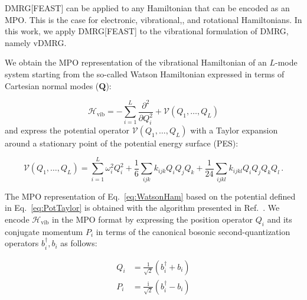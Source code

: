 \documentclass[journal=jctcce]{achemso}
\begin{document}
DMRG[FEAST] can be applied to any Hamiltonian that can be encoded as an MPO.
This is the case for electronic,\cite{Keller2015_MPS-MPO-SQHamiltonian,Chan2016_MPO-MPS,Battaglia2018_RelativisticDMRG} vibrational,\cite{Baiardi2017_VDMRG,Muolo2020_NEAP-DMRG}, and rotational\cite{Roy2018_RotationalDMRG} Hamiltonians.
In this work, we apply DMRG[FEAST] to the vibrational formulation of DMRG, namely vDMRG.\cite{Baiardi2017_VDMRG}

\noindent We obtain the MPO representation of the vibrational Hamiltonian of an $L$-mode system starting from the so-called Watson Hamiltonian expressed in terms of Cartesian normal modes ($\bm{Q}$):\cite{Watson1968_Hamiltonian,Papousek}

\begin{equation}
  \mathcal{H}_\text{vib} = - \sum_{i=1}^L \frac{\partial^2}{\partial Q_i^2} 
                           + \mathcal{V}(Q_1, \ldots, Q_L)
  \label{eq:WatsonHam}
\end{equation}
%
and express the potential operator $\mathcal{V}(Q_1, \ldots, Q_L)$ with a Taylor expansion around a stationary point of the potential energy surface (PES):

\begin{equation}
  \mathcal{V}(Q_1, \ldots, Q_L) = \sum_{i=1}^L \omega_i^2 Q_i^2 
                                + \frac{1}{6} \sum_{ijk} k_{ijk} Q_i Q_j Q_k
                                + \frac{1}{24} \sum_{ijkl} k_{ijkl} Q_i Q_j Q_k Q_l\, .
  \label{eq:PotTaylor}
\end{equation}

\noindent The MPO representation of Eq.~\ref{eq:WatsonHam} based on the potential defined in Eq.~\ref{eq:PotTaylor} is obtained with the algorithm presented in Ref.~.
We encode $\mathcal{H}_\text{vib}$ in the MPO format by expressing the position operator $Q_i$ and its conjugate momentum $P_i$ in terms of the canonical bosonic second-quantization operators $b_i^\dagger, b_i$ as follows:

\begin{equation}
  \begin{aligned}
    Q_i &= \frac{1}{\sqrt{2}} \left( b_i^\dagger + b_i \right) \\
    P_i &= \frac{\mathrm{i}}{\sqrt{2}} \left( b_i^\dagger - b_i \right) \\
  \end{aligned}
  \label{eq:CanonicalQuantization}
\end{equation}
\end{document}

